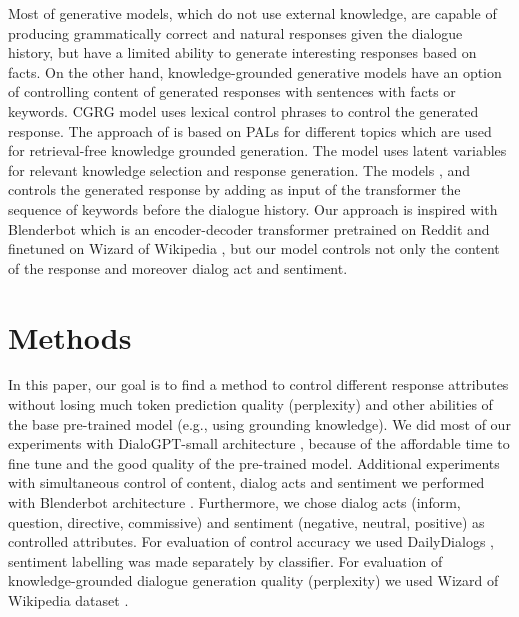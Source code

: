 \documentclass[11pt]{article}
\begin{document}
Most of generative models, which do not use external knowledge, are capable of producing grammatically correct and natural responses given the dialogue history, but have a limited ability to generate interesting responses based on facts. On the other hand, knowledge-grounded generative models have an option of controlling content of generated responses with sentences with facts or keywords. CGRG \cite{wu2021controllable} model uses lexical control phrases to control the generated response. The approach of \cite{xu2021retrieval} is based on PALs for different topics which are used for retrieval-free knowledge grounded generation. The model \cite{zhan2021colv} uses latent variables for relevant knowledge selection and response generation. The models \cite{xu2021generating}, \cite{kumar2021controllable} and \cite{gupta2020controlling} controls the generated response by adding as input of the transformer the sequence of keywords before the dialogue history. Our approach is inspired with Blenderbot \cite{roller2020recipes} which is an encoder-decoder transformer pretrained on Reddit and finetuned on Wizard of Wikipedia \cite{dinan2018wizard}, but our model controls not only the content of the response and moreover dialog act and sentiment.

\section{Methods}
In this paper, our goal is to find a method to control different response attributes without losing much token prediction quality (perplexity) and other abilities of the base pre-trained model (e.g., using grounding knowledge). We did most of our experiments with   DialoGPT-small architecture \cite{zhang2020dialogpt}, because of the affordable time to fine tune and the good quality of the pre-trained model. 
Additional experiments with simultaneous control of content, dialog acts and sentiment we performed with Blenderbot architecture \cite{roller2020recipes}.
Furthermore, we chose dialog acts (inform, question, directive, commissive) and sentiment (negative, neutral, positive) as controlled attributes. For evaluation of control accuracy we used DailyDialogs \cite{li2017dailydialog}, sentiment labelling was made separately by classifier. For evaluation of knowledge-grounded dialogue generation quality (perplexity) we used Wizard of Wikipedia dataset \cite{dinan2018wizard}.
\end{document}
